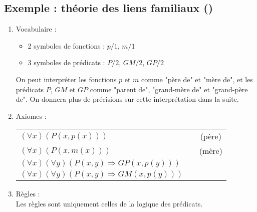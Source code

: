 \subsection{Exemple : théorie des liens familiaux ()}
\begin{enumerate}
\item Vocabulaire : 
\begin{itemize}
\item 2 symboles de fonctions : $p/1$, $m/1$
\item 3 symboles de prédicats : $P/2$, $GM/2$, $GP/2$\\
\end{itemize}

On peut interpréter les fonctions $p$ et $m$ comme "père de" et "mère de", et les prédicats $P$, $GM$ et $GP$ comme "parent de", "grand-mère de" et "grand-père de". On donnera plus de précisions sur cette interprétation dans la suite.\\

\item Axiomes : \\
\begin{center}
\begin{tabular}{lcc}
$(\forall x) \left(P(x,p(x))\right)$ & \hspace*{2cm}& (père)\\
$(\forall x) \left(P(x,m(x))\right)$ & \hspace*{2cm}& (mère)\\
$(\forall x)(\forall y) \left(P(x,y)\Rightarrow GP(x,p(y)) \right)$&&\\
$(\forall x)(\forall y) \left(P(x,y)\Rightarrow GM(x,p(y)) \right)$&&\\
\end{tabular}
\end{center}

\item Règles : \\
Les règles sont uniquement celles de la logique des prédicats.
\end{enumerate}

